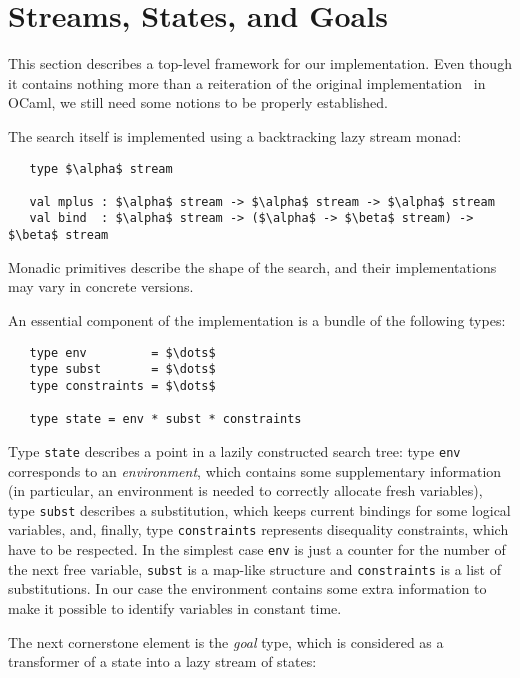 \section{Streams, States, and Goals}
\label{sec:goals}

This section describes a top-level framework for our implementation. Even though it contains
nothing more than a reiteration of the original implementation~\cite{MicroKanren, CKanren}
in OCaml, we still need some notions to be properly established.

The search itself is implemented using a backtracking lazy stream monad:

\begin{lstlisting}
   type $\alpha$ stream

   val mplus : $\alpha$ stream -> $\alpha$ stream -> $\alpha$ stream
   val bind  : $\alpha$ stream -> ($\alpha$ -> $\beta$ stream) -> $\beta$ stream
\end{lstlisting}

Monadic primitives describe the shape of the search, and their implementations may
vary in concrete \miniKanren versions.

An essential component of the implementation is a bundle of the following types:

\begin{lstlisting}
   type env         = $\dots$
   type subst       = $\dots$
   type constraints = $\dots$

   type state = env * subst * constraints
\end{lstlisting}

Type \lstinline{state} describes a point in a lazily constructed search tree: type \lstinline{env} corresponds
to an \emph{environment}, which contains some supplementary information (in particular, an environment is needed to
correctly allocate fresh variables), type \lstinline{subst} describes a substitution, which keeps current bindings
for some logical variables, and, finally, type \lstinline{constraints} represents disequality constraints,
which have to be respected. In the simplest case \lstinline{env} is just a counter for the number of the next free
variable, \lstinline{subst} is a map-like structure and \lstinline{constraints} is a list of substitutions. In our
case the environment contains some extra information to make it possible to identify variables in constant time.

The next cornerstone element is the \emph{goal} type, which is considered as a transformer of a state into
a lazy stream of states:

